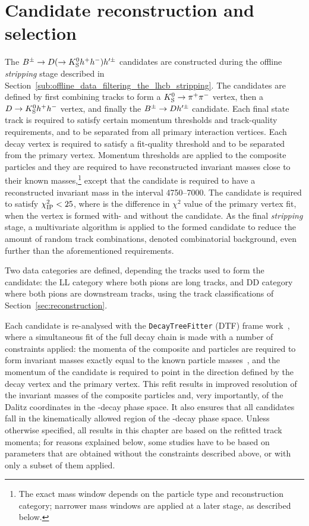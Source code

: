 \section{Candidate reconstruction and selection} %
\label{sec:candidate_selection}

The ${{B}^\pm}\rightarrow{\ensuremath{D}}(\rightarrow{\ensuremath{{K}^0_{\mathrm{S}}}} h^+h^-)h'^\pm$ candidates are constructed during the offline \emph{stripping} stage described in Section~\ref{sub:offline_data_filtering_the_lhcb_stripping}. The candidates are defined by first combining tracks to form a ${{K}^0_{\mathrm{S}}}\rightarrow{\ensuremath{{\pi}^+}}{\ensuremath{{\pi}^-}}$ vertex, then a ${D}\rightarrow{\ensuremath{{K}^0_{\mathrm{S}}}} h^+h^-$ vertex, and finally the ${{B}^\pm}\rightarrow{\ensuremath{D}} h'^\pm$ candidate. Each final state track is required to satisfy certain momentum thresholds and track-quality requirements, and to be separated from all primary interaction vertices. Each decay vertex is required to satisfy a fit-quality threshold and to be separated from the primary vertex. Momentum thresholds are applied to the composite particles and they are required to have reconstructed invariant masses close to their known masses,\footnote{The exact mass window depends on the particle type and reconstruction category; narrower mass windows are applied at a later stage, as described below.} except that the \B candidate is required to have a reconstructed invariant mass in the interval 4750--7000\mevcc. The \B candidate is required to satisfy $\chi^2_{\text{IP}} <25$, where \ipchisq is the difference in $\chi^2$ value of the primary vertex fit, when the vertex is formed with- and without the \B candidate. As the final \emph{stripping} stage, a multivariate algorithm is applied to the formed \B candidate to reduce the amount of random track combinations, denoted combinatorial background, even further than the aforementioned requirements.

Two data categories are defined, depending the tracks used to form the \KS candidate: the LL category where both pions are long tracks, and DD category where both pions are downstream tracks, using the track classifications of Section~\ref{sec:reconstruction}.


Each candidate is re-analysed with the \texttt{DecayTreeFitter} (DTF) frame work~\cite{DTF}, where a simultaneous fit of the full decay chain is made with a number of constraints applied: the momenta of the composite \D and \KS particles are required to form invariant masses exactly equal to the known particle masses~\cite{PDG2020}, and the momentum of the \B candidate is required to point in the direction defined by the \B decay vertex and the primary vertex. This refit results in improved resolution of the invariant masses of the composite particles and, very importantly, of the Dalitz coordinates in the \D-decay phase space. It also ensures that all candidates fall in the kinematically allowed region of the \D-decay phase space. Unless otherwise specified, all results in this chapter are based on the refitted track momenta; for reasons explained below, some studies have to be based on parameters that are obtained without the constraints described above, or with only a subset of them applied.



